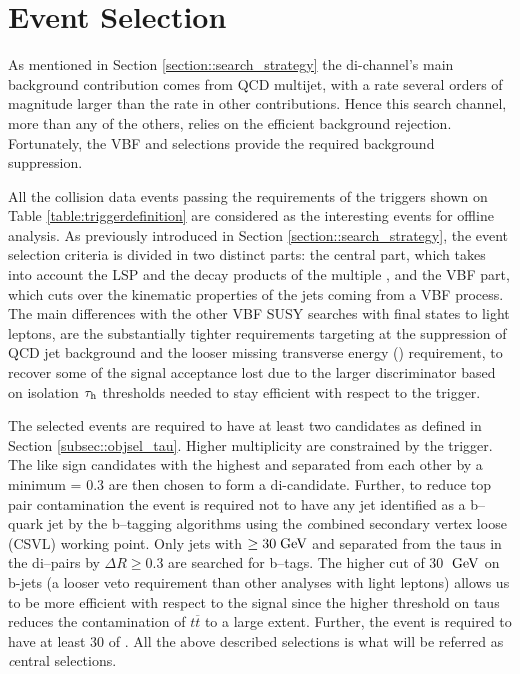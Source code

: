 \section{Event Selection}
\label{sec:eventselection}

As mentioned in Section \ref{section::search_strategy} the di-\hadtau channel's main background contribution comes from QCD multijet, with a rate several orders of magnitude larger than the rate in other contributions.  Hence this search channel, more than any of the others, relies on the efficient background rejection. Fortunately, the VBF and \met selections provide the required background suppression.

All the collision data events passing the requirements of the triggers shown on Table \ref{table:triggerdefinition} are considered as the interesting events for offline analysis. As previously introduced in Section \ref{section::search_strategy}, the event selection criteria is divided in two distinct parts: the central part, which takes into account the LSP and the decay products of the multiple \hadtau, and the VBF part, which cuts over the kinematic properties of the jets coming from a VBF process. The main differences with the other VBF SUSY searches with final states to light leptons, are the substantially tighter \hadtau requirements targeting at the suppression of QCD jet background and the looser missing transverse energy (\met) requirement, to recover some of the signal acceptance lost due to the larger discriminator based on isolation $\tau_{\text{h}}$ \pt thresholds needed to stay efficient with respect to the trigger.  

The selected events are required to have at least two \hadtau candidates as defined in Section \ref{subsec::objsel_tau}. Higher multiplicity \hadtau are constrained by the trigger. The like sign \hadtau candidates with the highest \pt and separated from each other by a minimum \deltar = 0.3 are then chosen to form a di-\hadtau candidate. 
Further, to reduce top pair contamination the event is required not to have any jet identified as a b--quark jet by the b--tagging algorithms using the {\textit combined secondary vertex loose} (CSVL) working point. Only jets with \pt $\ge 30 \;\text{Ge}\kern-0.06667em\text{V}$ and separated from the taus in the di--\hadtau pairs by $\Delta R \ge 0.3$ are searched for b--tags. The higher \pt cut of 30 $\;\text{Ge}\kern-0.06667em\text{V}$ on b-jets (a looser veto requirement than other analyses with light leptons) allows us to be more efficient with respect to the signal since the higher \pt threshold on taus reduces the contamination of $t\overline{t}$ to a large extent. Further, the event is required to have at least 30 \gev of \met. All the above described selections is what will be referred as {\textit central selections}.

